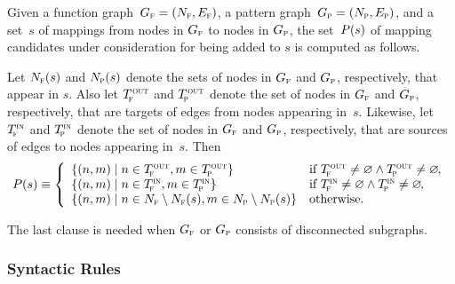 Given a \gls{function graph}~\mbox{$\fG = \mPair{\fN}{\fE}$}, a \gls{pattern
  graph}~\mbox{$\pG = \mPair{\pN}{\pE}$}, and a set~$s$ of mappings from
\glspl{node} in $G_{\textrm{\textsc{f}}}$ to \glspl{node} in $G_{\textrm{\textsc{p}}}$, the set~$P(s)$ of mapping
candidates under consideration for being added to $s$ is computed as follows.
%
\begin{definition}
  Let $N_{\textrm{\textsc{f}}}(s)$ and $N_{\textrm{\textsc{p}}}(s)$ denote the sets of \glspl{node} in $G_{\textrm{\textsc{f}}}$ and $G_{\textrm{\textsc{p}}}$,
  respectively, that appear in $s$.
  Also let $T_{\!\textrm{\textsc{f}}}^{\hspace{.5pt}\textrm{\textsc{out}}}$ and $T_{\!\textrm{\textsc{p}}}^{\hspace{.5pt}\textrm{\textsc{out}}}$ denote the set of \glspl{node} in $G_{\textrm{\textsc{f}}}$ and
  $G_{\textrm{\textsc{p}}}$, respectively, that are targets of \glspl{edge} from \glspl{node}
  appearing in~$s$.
  Likewise, let $T_{\!\textrm{\textsc{f}}}^{\textrm{\textsc{in}}}$ and $T_{\!\textrm{\textsc{p}}}^{\textrm{\textsc{in}}}$ denote the set of \glspl{node} in $G_{\textrm{\textsc{f}}}$ and
  $G_{\textrm{\textsc{p}}}$, respectively, that are sources of \glspl{edge} to \glspl{node}
  appearing in~$s$.
  Then
  \begin{displaymath}
    \mCandSet \equiv
    \left\{
    \begin{array}{ll}
        \mSetBuilder{\mPair{n}{m}}{n \in \fTout, m \in \pTout}
      & \text{if} \ \fTout \neq \emptyset \mAnd \pTout \neq \emptyset
        \hspace{-1pt}, \\
        \mSetBuilder{\mPair{n}{m}}{n \in \fTin, m \in \pTin}
      & \text{if} \ \fTin \neq \emptyset \mAnd \pTin \neq \emptyset
        \hspace{-1pt}, \\
        \mSetBuilder{\mPair{n}{m}}{
                                    n \in \fN \setminus \fN(s),
                                    m \in \pN \setminus \pN(s)
                                  }
      & \text{otherwise}.
    \end{array}
    \right.
  \end{displaymath}%
\end{definition}
%
The last clause is needed when $G_{\textrm{\textsc{f}}}$ or $G_{\textrm{\textsc{p}}}$ consists of disconnected
\glspl{subgraph}.


\subsubsection{Syntactic Rules}

\def\mSynPredRule{R_{\mathsc{pred}}}
\def\mSynSuccRule{R_{\mathsc{succ}}}
\def\mSynInRule{R_{\mathsc{in}}}
\def\mSynOutRule{R_{\mathsc{out}}}
\def\mSynNewRule{R_\mathsc{new}}

